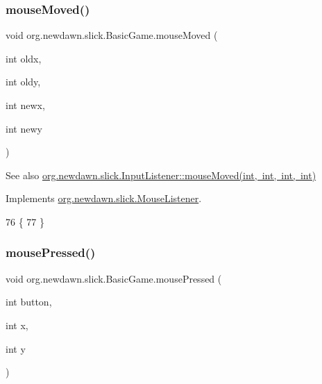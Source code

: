 \subsubsection{\texorpdfstring{mouse\+Moved()}{mouseMoved()}}
{\footnotesize\ttfamily void org.\+newdawn.\+slick.\+Basic\+Game.\+mouse\+Moved (\begin{DoxyParamCaption}\item[{int}]{oldx,  }\item[{int}]{oldy,  }\item[{int}]{newx,  }\item[{int}]{newy }\end{DoxyParamCaption})\hspace{0.3cm}{\ttfamily [inline]}}

\begin{DoxySeeAlso}{See also}
\mbox{\hyperlink{interfaceorg_1_1newdawn_1_1slick_1_1_mouse_listener_ad41216afc84f2c8d38f91e8b2d46bed9}{org.\+newdawn.\+slick.\+Input\+Listener\+::mouse\+Moved(int, int, int, int)}} 
\end{DoxySeeAlso}


Implements \mbox{\hyperlink{interfaceorg_1_1newdawn_1_1slick_1_1_mouse_listener_ad41216afc84f2c8d38f91e8b2d46bed9}{org.\+newdawn.\+slick.\+Mouse\+Listener}}.


\begin{DoxyCode}
76                                                                    \{
77     \}
\end{DoxyCode}
\mbox{\label{classorg_1_1newdawn_1_1slick_1_1_basic_game_af00b33ec970972ecabe458cbc6d66e8a}} 
\subsubsection{\texorpdfstring{mouse\+Pressed()}{mousePressed()}}
{\footnotesize\ttfamily void org.\+newdawn.\+slick.\+Basic\+Game.\+mouse\+Pressed (\begin{DoxyParamCaption}\item[{int}]{button,  }\item[{int}]{x,  }\item[{int}]{y }\end{DoxyParamCaption})\hspace{0.3cm}{\ttfamily [inline]}}

